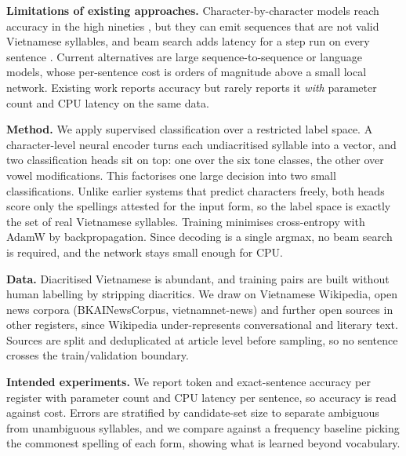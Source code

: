 \documentclass{article}
\begin{document}
\textbf{Limitations of existing approaches.}
Character-by-character models reach accuracy in the high nineties
\citep{do2013mt,nga2019deep}, but they can emit sequences that are not valid
Vietnamese syllables, and beam search adds latency for a step run on every
sentence \citep{dang2020tdp}. Current alternatives are large
sequence-to-sequence or language models, whose per-sentence cost is orders of
magnitude above a small local network. Existing work reports accuracy but rarely
reports it \emph{with} parameter count and CPU latency on the same data.

\textbf{Method.}
We apply supervised classification over a restricted label space. A
character-level neural encoder turns each undiacritised syllable into a vector,
and two classification heads sit on top: one over the six tone classes, the other
over vowel modifications. This factorises one large decision into two small
classifications. Unlike earlier systems that predict characters freely, both heads
score only the spellings attested for the input form, so the label space is
exactly the set of real Vietnamese syllables. Training minimises cross-entropy
with AdamW by backpropagation. Since decoding is a single argmax, no beam search
is required, and the network stays small enough for CPU.

\textbf{Data.}
Diacritised Vietnamese is abundant, and training pairs are built without human
labelling by stripping diacritics. We draw on Vietnamese Wikipedia, open news corpora
(BKAINewsCorpus, vietnamnet-news) and further open sources in other registers,
since Wikipedia under-represents conversational and literary text. Sources are
split and deduplicated at article level before sampling, so no sentence crosses
the train/validation boundary.

\textbf{Intended experiments.}
We report token and exact-sentence accuracy per register with parameter count
and CPU latency per sentence, so accuracy is read against cost. Errors are
stratified by candidate-set size to separate ambiguous from unambiguous syllables,
and we compare against a frequency baseline picking the commonest spelling of each
form, showing what is learned beyond vocabulary.



\end{document}
